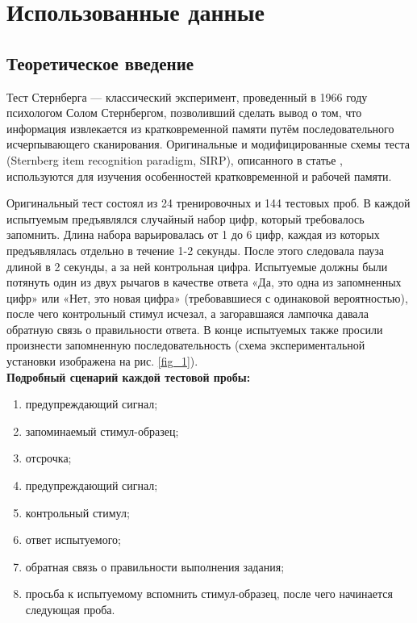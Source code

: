\newpage

\section{Использованные данные}

\subsection{Теоретическое введение}

Тест Стернберга --- классический эксперимент, проведенный в 1966 году психологом
Солом Стернбергом, позволивший сделать вывод о том, что информация извлекается из
кратковременной памяти путём последовательного исчерпывающего сканирования.
Оригинальные и модифицированные схемы теста (Sternberg item recognition paradigm,
SIRP), описанного в статье \cite{Sternberg_item_recognition}, используются для изучения особенностей кратковременной и рабочей памяти. 

Оригинальный тест состоял из 24 тренировочных и 144 тестовых проб. В каждой испытуемым
предъявлялся случайный набор цифр, который требовалось запомнить. Длина набора
варьировалась от 1 до 6 цифр, каждая из которых предъявлялась отдельно в течение 1-2 секунды.
После этого следовала пауза длиной в 2 секунды, а за ней контрольная цифра. Испытуемые должны
были потянуть один из двух рычагов в качестве ответа «Да, это одна из запомненных цифр» или «Нет,
это новая цифра» (требовавшиеся с одинаковой вероятностью), после чего контрольный стимул исчезал,
а загоравшаяся лампочка давала обратную связь о правильности ответа. В конце испытуемых также
просили произнести запомненную последовательность (схема экспериментальной установки изображена
на рис. \ref{fig_1}). \\[0.3 cm]
\textbf{Подробный сценарий каждой тестовой пробы:}

\begin{enumerate}
    \item предупреждающий сигнал;
    \item запоминаемый стимул-образец;
    \item отсрочка;
    \item предупреждающий сигнал;
    \item контрольный стимул;
    \item ответ испытуемого;
    \item обратная связь о правильности выполнения задания;
    \item просьба к испытуемому вспомнить стимул-образец, после чего начинается следующая проба.
\end{enumerate}

